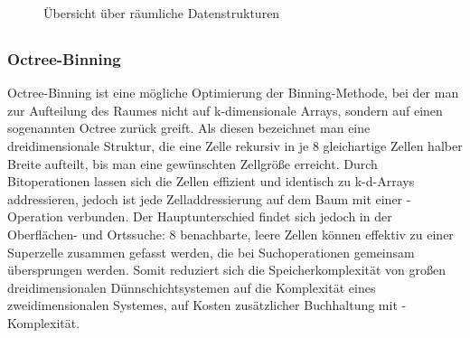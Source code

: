 \begin{figure}[bhpt]
  \caption[Übersicht über räumliche Datenstrukturen]{Übersicht über räumliche Datenstrukturen}
  \label{fig:datastructures}
\end{figure}

\subsection{}

\subsubsection{Octree-Binning}
Octree-Binning ist eine mögliche Optimierung der Binning-Methode, bei der man zur Aufteilung des Raumes nicht auf k-dimensionale Arrays, sondern auf einen sogenannten Octree zurück greift.
Als diesen bezeichnet man eine dreidimensionale Struktur, die eine Zelle rekursiv in je 8 gleichartige Zellen halber Breite aufteilt, bis man eine gewünschten Zellgröße erreicht.
Durch Bitoperationen lassen sich die Zellen effizient und identisch zu k-d-Arrays addressieren, jedoch ist jede Zelladdressierung auf dem Baum mit einer -Operation verbunden.
Der Hauptunterschied findet sich jedoch in der Oberflächen- und Ortssuche:
8 benachbarte, leere Zellen können effektiv zu einer Superzelle zusammen gefasst werden, die bei Suchoperationen gemeinsam übersprungen werden.
Somit reduziert sich die Speicherkomplexität von großen dreidimensionalen Dünnschichtsystemen auf die Komplexität eines zweidimensionalen Systemes, auf Kosten zusätzlicher Buchhaltung mit -Komplexität.


